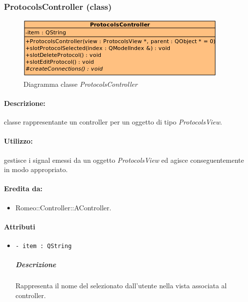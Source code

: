 	\subsubsection{ProtocolsController (class)}
	\begin{figure}[!h]
		\centering
		\includegraphics[scale=2.75]{./Content/Immagini/controller/ProtocolsController}
		\caption{Diagramma classe \textsl{ProtocolsController}}
	\end{figure}
	\paragraph{Descrizione:} classe rappresentante un controller per un oggetto di tipo \textsl{ProtocolsView}.
	\paragraph{Utilizzo:} gestisce i signal\g{} emessi da un oggetto \textsl{ProtocolsView} ed agisce conseguentemente in modo appropriato.
	\paragraph{Eredita da:}
		\begin{itemize}
			\item Romeo::Controller::AController.
		\end{itemize}
	\paragraph{Attributi}
		\begin{itemize}
			\item \color{teal} \verb!- item : QString!
			\color{black}
			\subparagraph{Descrizione} Rappresenta il nome del \protocol{} selezionato dall'utente nella vista associata al controller.
		\end{itemize}
